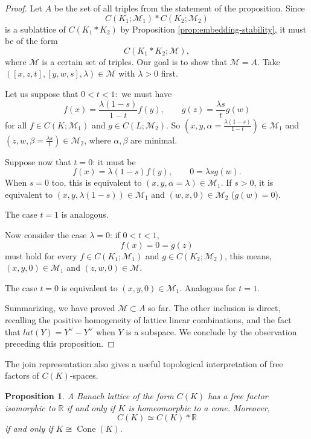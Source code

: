 \documentclass[12pt]{amsart}
\theoremstyle{plain}
\newtheorem{proposition}[theorem]{Proposition}
\theoremstyle{definition}
\begin{document}
\begin{proof}
Let $A$ be the set of all triples from the statement of the proposition. Since 
\[
C(K_1;\mathcal{M}_1)\ast C(K_2;\mathcal{M}_2)
\]
is a sublattice of $C(K_1\ast K_2)$ by Proposition \ref{prop:embedding-stability}, it must be of the form
\[
C(K_1*K_2;\mathcal M),
\]
where $\mathcal M$ is a certain set of triples. Our goal is to show that $\mathcal M=A$. Take $([x,z,t],[y,w,s],\lambda)\in\mathcal{M}$ with $\lambda>0$ first.

Let us suppose that $0<t<1:$
we must have \[
f(x)=\frac{\lambda(1-s)}{1-t}f(y), \qquad g(z)=\frac{\lambda s}{t}g(w)
\] for all $f\in C(K;\mathcal{M}_1)$ and $g\in C(L;\mathcal{M}_2)$. So $(x,y,\alpha=\frac{\lambda(1-s)}{1-t})\in\mathcal{M}_1$ and $(z,w,\beta=\frac{\lambda s}{t})\in\mathcal{M}_2$, where $\alpha,\beta$ are minimal. 

Suppose now that $t=0$: it must be
\[
f(x)=\lambda(1-s)f(y), \qquad 0=\lambda sg(w).
\] When $s=0$ too, this is equivalent to $(x,y,\alpha=\lambda)\in\mathcal{M}_1$. If $s>0$, it is equivalent to $(x,y,\lambda (1-s))\in\mathcal {M}_1$ and $(w,x,0)\in \mathcal{M}_2$ ($g(w)=0$). 

The case $t=1$ is analogous.

Now consider the case $\lambda=0$: if $0<t<1$, \[
f(x)=0=g(z)
\]
must hold for every $f\in C(K_1;\mathcal{M}_1)$ and $g\in C(K_2;\mathcal{M}_2)$, this means, $(x,y,0)\in\mathcal{M}_1$ and $(z,w,0)\in\mathcal{M}$. 

 

The case $t=0$ is equivalent to $(x,y,0)\in\mathcal{M}_1$. Analogous for $t=1$.

 

Summarizing, we have proved $\mathcal{M}\subset A$ so far. The other inclusion is direct, recalling the positive homogeneity of lattice linear combinations, and the fact that $lat(Y)=Y^{\vee}-Y^{\vee}$ when $Y$ is a subspace. We conclude by the observation preceding this proposition.
\end{proof}





The join representation also gives a useful topological interpretation of free factors of $C(K)$-spaces.

\begin{proposition}\label{prop:cone-factor}
A Banach lattice of the form $C(K)$ has a free factor isomorphic to $\mathbb{R}$ if and only if $K$ is homeomorphic to a cone. Moreover,
\[
C(K)\simeq C(K)\ast \mathbb{R}
\]
if and only if $K\cong \operatorname{Cone}(K)$.
\end{proposition}
\end{document}
